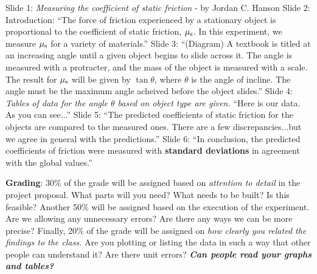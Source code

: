 \documentclass[10pt]{article}
\begin{document}
\begin{outline}[enumerate]
\1 Slide 1: \textit{Measuring the coefficient of static friction} - by Jordan C. Hanson
\1 Slide 2: Introduction: ``The force of friction experienced by a stationary object is proportional to the coefficient of static friction, $\mu_{\rm s}$.  In this experiment, we measure $\mu_{\rm s}$ for a variety of materials.''
\1 Slide 3: ``(Diagram) A textbook is titled at an increasing angle until a given object begins to slide across it.  The angle is measured with a protracter, and the mass of the object is measured with a scale.  The result for $\mu_{\rm s}$ will be given by $\tan\theta$, where $\theta$ is the angle of incline.  The angle must be the maximum angle acheived before the object slides.''
\1 Slide 4: \textit{Tables of data for the angle $\theta$ based on object type are given.}  ``Here is our data.  As you can see...''
\1 Slide 5: ``The predicted coefficients of static friction for the objects are compared to the measured ones.  There are a few discrepancies...but we agree in general with the predictions.''
\1 Slide 6: ``In conclusion, the predicted coefficients of friction were measured with \textbf{standard deviations} in agreement with the global values.''
\end{outline}
\textbf{Grading}: 30\% of the grade will be assigned based on \textit{attention to detail} in the project proposal.  What parts will you need?  What needs to be built?  Is this feasible?  Another 50\% will be assigned based on the execution of the experiment.  Are we allowing any unnecessary errors?  Are there any ways we can be more precise?  Finally, 20\% of the grade will be assigned on \textit{how clearly you related the findings to the class.}  Are you plotting or listing the data in such a way that other people can understand it?  Are there unit errors?  \textbf{\textit{Can people read your graphs and tables?}}
\end{document}
